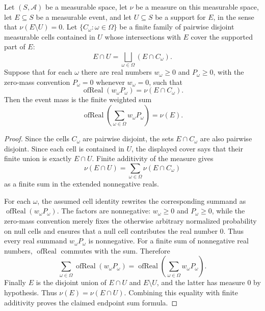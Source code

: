 \begin{helper}
Let \((S,\mathcal A)\) be a measurable space, let \(\nu\) be a measure on
this measurable space, let \(E\subseteq S\) be a measurable event, and let
\(U\subseteq S\) be a support for \(E\), in the sense that
\(\nu(E\setminus U)=0\).  Let
\(\{C_\omega:\omega\in\Omega\}\) be a finite family of pairwise disjoint
measurable cells contained in \(U\) whose intersections with \(E\) cover the
supported part of \(E\):
\[
E\cap U=\bigsqcup_{\omega\in\Omega}(E\cap C_\omega).
\]
Suppose that for each \(\omega\) there are real numbers \(w_\omega\ge0\) and
\(P_\omega\ge0\), with the zero-mass convention \(P_\omega=0\) whenever
\(w_\omega=0\), such that
\[
\operatorname{ofReal}(w_\omega P_\omega)=\nu(E\cap C_\omega).
\]
Then the event mass is the finite weighted sum
\[
\operatorname{ofReal}\!\left(\sum_{\omega\in\Omega}w_\omega P_\omega\right)
=\nu(E).
\]
\end{helper}
\begin{proof}
Since the cells \(C_\omega\) are pairwise disjoint, the sets
\(E\cap C_\omega\) are also pairwise disjoint.  Since each cell is contained
in \(U\), the displayed cover says that their finite union is exactly
\(E\cap U\).  Finite additivity of the measure gives
\[
\nu(E\cap U)=\sum_{\omega\in\Omega}\nu(E\cap C_\omega)
\]
as a finite sum in the extended nonnegative reals.

For each \(\omega\), the assumed cell identity rewrites the corresponding
summand as \(\operatorname{ofReal}(w_\omega P_\omega)\).  The factors are
nonnegative: \(w_\omega\ge0\) and \(P_\omega\ge0\), while the zero-mass
convention merely fixes the otherwise arbitrary normalized probability on
null cells and ensures that a null cell contributes the real number \(0\).
Thus every real summand \(w_\omega P_\omega\) is nonnegative.  For a finite
sum of nonnegative real numbers, \(\operatorname{ofReal}\) commutes with the
sum.  Therefore
\[
\sum_{\omega\in\Omega}\operatorname{ofReal}(w_\omega P_\omega)
=
\operatorname{ofReal}\!\left(\sum_{\omega\in\Omega}w_\omega P_\omega\right).
\]
Finally \(E\) is the disjoint union of \(E\cap U\) and \(E\setminus U\), and
the latter has measure \(0\) by hypothesis.  Thus \(\nu(E)=\nu(E\cap U)\).
Combining this equality with finite additivity proves the claimed endpoint
sum formula.
\end{proof}
